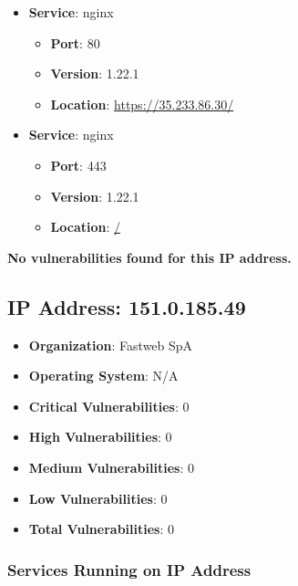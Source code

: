 \documentclass{article}
\begin{document}
\begin{itemize}
    
        \item \textbf{Service}: nginx
        \begin{itemize}
            \item \textbf{Port}: 80
            \item \textbf{Version}:  1.22.1 
            \item \textbf{Location}: \href{ https://35.233.86.30/ }{ https://35.233.86.30/ }
        \end{itemize}
    
        \item \textbf{Service}: nginx
        \begin{itemize}
            \item \textbf{Port}: 443
            \item \textbf{Version}:  1.22.1 
            \item \textbf{Location}: \href{ / }{ / }
        \end{itemize}
    
\end{itemize}


\textbf{No vulnerabilities found for this IP address.}




\clearpage



\subsection{IP Address: 151.0.185.49}

\begin{itemize}
    \item \textbf{Organization}: Fastweb SpA
    \item \textbf{Operating System}:  N/A 
    \item \textbf{Critical Vulnerabilities}: 0
    \item \textbf{High Vulnerabilities}: 0
    \item \textbf{Medium Vulnerabilities}: 0
    \item \textbf{Low Vulnerabilities}: 0
    \item \textbf{Total Vulnerabilities}: 0
\end{itemize}

\subsubsection*{Services Running on IP Address}
\end{document}

